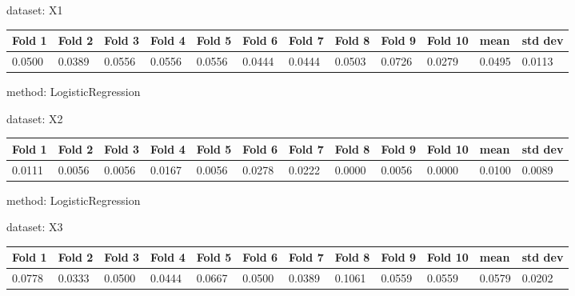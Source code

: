 \documentclass{article}
\begin{document}
\noindent dataset: X1

\begin{center}
	\begin{tabular}  { | l | l | l | l | l | l | l | l | l | l | l | l | }
	\hline
	Fold 1 & Fold 2 & Fold 3 & Fold 4 & Fold 5 & Fold 6 & Fold 7 & Fold 8 & Fold 9 & Fold 10 & mean & std dev\\ \hline
	0.0500 & 0.0389 & 0.0556 & 0.0556 & 0.0556 & 0.0444 & 0.0444 & 0.0503 & 0.0726 & 0.0279 & 0.0495 & 0.0113\\
	\hline
	\end{tabular}
\end{center}
\noindent method: LogisticRegression

\noindent dataset: X2

\begin{center}
	\begin{tabular}  { | l | l | l | l | l | l | l | l | l | l | l | l | }
	\hline
	Fold 1 & Fold 2 & Fold 3 & Fold 4 & Fold 5 & Fold 6 & Fold 7 & Fold 8 & Fold 9 & Fold 10 & mean & std dev\\ \hline
	0.0111 & 0.0056 & 0.0056 & 0.0167 & 0.0056 & 0.0278 & 0.0222 & 0.0000 & 0.0056 & 0.0000 & 0.0100 & 0.0089\\
	\hline
	\end{tabular}
\end{center}
\noindent method: LogisticRegression

\noindent dataset: X3

\begin{center}
	\begin{tabular}  { | l | l | l | l | l | l | l | l | l | l | l | l | }
	\hline
	Fold 1 & Fold 2 & Fold 3 & Fold 4 & Fold 5 & Fold 6 & Fold 7 & Fold 8 & Fold 9 & Fold 10 & mean & std dev\\ \hline
	0.0778 & 0.0333 & 0.0500 & 0.0444 & 0.0667 & 0.0500 & 0.0389 & 0.1061 & 0.0559 & 0.0559 & 0.0579 & 0.0202\\
	\hline
	\end{tabular}
\end{center}
\end{document}
